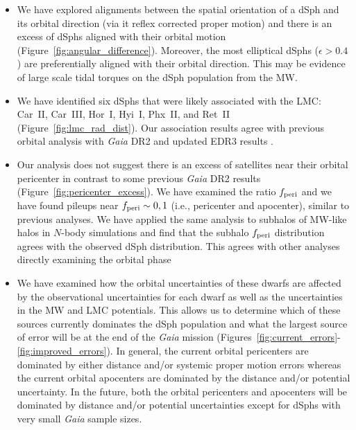 \documentclass[twocolumn]{aastex63}
\begin{document}
\begin{itemize}
\item We have explored alignments between the spatial orientation of a dSph and its orbital direction (via it reflex corrected proper motion) and there is an excess of dSphs aligned with their orbital motion (Figure~\ref{fig:angular_difference}). 
Moreover, the most elliptical dSphs ($\epsilon > 0.4$) are preferentially aligned with their orbital direction.  This may be evidence of large scale tidal torques on the dSph population from the MW. 



\item We have identified six dSphs that were likely associated with the LMC:  Car~II, Car~III, Hor~I, Hyi~I, Phx~II, and Ret~II  (Figure~\ref{fig:lmc_rad_dist}). 
Our association results agree with previous orbital analysis with {\it Gaia} DR2 and updated EDR3 results \citep{Kallivayalil2018ApJ...867...19K,Erkal2020MNRAS.495.2554E, Patel2020ApJ...893..121P, Battaglia2022A&A...657A..54B, CorreaMagnus2022MNRAS.511.2610C}. 



\item Our analysis does not suggest there is an excess of satellites near their orbital pericenter in contrast to some previous {\it Gaia} DR2 results   (Figure~\ref{fig:pericenter_excess}).  
We have examined the ratio $f_{\rm peri}$ and we have found  pileups  near $f_{\rm peri}\sim0, 1$ (i.e., pericenter and apocenter), similar to previous analyses.
We have applied the same analysis to subhalos of MW-like halos in $N$-body simulations and find  that the subhalo $f_{\rm peri}$ distribution agrees with the observed dSph distribution.
This agrees with other analyses directly examining the orbital phase \citep[e.g.,][]{CorreaMagnus2022MNRAS.511.2610C}



\item We have examined how the orbital uncertainties of these dwarfs are affected by the observational uncertainties for each dwarf as well as the uncertainties in the MW and LMC potentials. This allows us to determine which of these sources currently dominates the dSph population and what the largest source of error will be at the end of the {\it Gaia} mission (Figures~\ref{fig:current_errors}-\ref{fig:improved_errors}). 
In general, the current orbital pericenters are dominated by either distance and/or systemic proper motion errors  whereas the current orbital apocenters  are  dominated by the distance and/or potential uncertainty.  
In the future, both the orbital pericenters and apocenters will be dominated by distance and/or potential uncertainties except for dSphs with very small {\it Gaia} sample sizes. 


\end{itemize}
\end{document}
